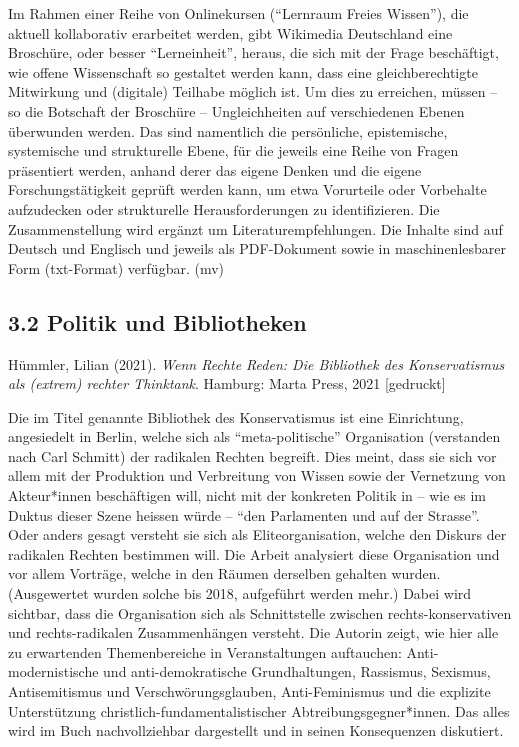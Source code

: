 \documentclass[a4paper,
fontsize=11pt,
oneside,
numbers=noperiodatend,
parskip=half-,
bibliography=totoc,
final
]{scrartcl}
\begin{document}
Im Rahmen einer Reihe von Onlinekursen (\enquote{Lernraum Freies
Wissen}), die aktuell kollaborativ erarbeitet werden, gibt Wikimedia
Deutschland eine Broschüre, oder besser \enquote{Lerneinheit}, heraus,
die sich mit der Frage beschäftigt, wie offene Wissenschaft so gestaltet
werden kann, dass eine gleichberechtigte Mitwirkung und (digitale)
Teilhabe möglich ist. Um dies zu erreichen, müssen -- so die Botschaft
der Broschüre -- Ungleichheiten auf verschiedenen Ebenen überwunden
werden. Das sind namentlich die persönliche, epistemische, systemische
und strukturelle Ebene, für die jeweils eine Reihe von Fragen
präsentiert werden, anhand derer das eigene Denken und die eigene
Forschungstätigkeit geprüft werden kann, um etwa Vorurteile oder
Vorbehalte aufzudecken oder strukturelle Herausforderungen zu
identifizieren. Die Zusammenstellung wird ergänzt um
Literaturempfehlungen. Die Inhalte sind auf Deutsch und Englisch und
jeweils als PDF-Dokument sowie in maschinenlesbarer Form (txt-Format)
verfügbar. (mv)

\hypertarget{politik-und-bibliotheken}{%
\subsection{3.2 Politik und
Bibliotheken}\label{politik-und-bibliotheken}}

Hümmler, Lilian (2021). \emph{Wenn Rechte Reden: Die Bibliothek des
Konservatismus als (extrem) rechter Thinktank}. Hamburg: Marta Press,
2021 {[}gedruckt{]}

Die im Titel genannte Bibliothek des Konservatismus ist eine
Einrichtung, angesiedelt in Berlin, welche sich als
\enquote{meta-politische} Organisation (verstanden nach Carl Schmitt)
der radikalen Rechten begreift. Dies meint, dass sie sich vor allem mit
der Produktion und Verbreitung von Wissen sowie der Vernetzung von
Akteur*innen beschäftigen will, nicht mit der konkreten Politik in --
wie es im Duktus dieser Szene heissen würde -- \enquote{den Parlamenten
und auf der Strasse}. Oder anders gesagt versteht sie sich als
Eliteorganisation, welche den Diskurs der radikalen Rechten bestimmen
will. Die Arbeit analysiert diese Organisation und vor allem Vorträge,
welche in den Räumen derselben gehalten wurden. (Ausgewertet wurden
solche bis 2018, aufgeführt werden mehr.) Dabei wird sichtbar, dass die
Organisation sich als Schnittstelle zwischen rechts-konservativen und
rechts-radikalen Zusammenhängen versteht. Die Autorin zeigt, wie hier
alle zu erwartenden Themenbereiche in Veranstaltungen auftauchen:
Anti-modernistische und anti-demokratische Grundhaltungen, Rassismus,
Sexismus, Antisemitismus und Verschwörungsglauben, Anti-Feminismus und
die explizite Unterstützung christlich-fundamentalistischer
Abtreibungsgegner*innen. Das alles wird im Buch nachvollziehbar
dargestellt und in seinen Konsequenzen diskutiert.
\end{document}
